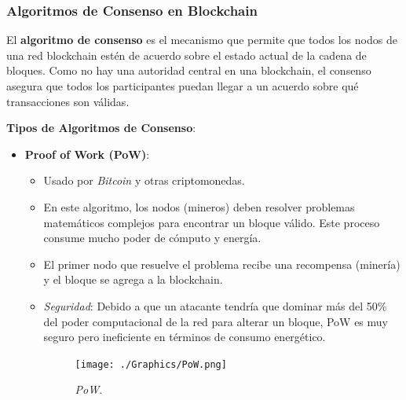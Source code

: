 \subsubsection{Algoritmos de Consenso en Blockchain}

El \textbf{algoritmo de consenso} es el mecanismo que permite que todos los nodos de una red blockchain estén de acuerdo sobre el estado actual de la cadena de bloques. Como no hay una autoridad central en una blockchain, el consenso asegura que todos los participantes puedan llegar a un acuerdo sobre qué transacciones son válidas.

\textbf{Tipos de Algoritmos de Consenso}:
\begin{itemize}
    \item \textbf{Proof of Work (PoW)}:
    \begin{itemize}
        \item Usado por \textit{Bitcoin} y otras criptomonedas.
        \item En este algoritmo, los nodos (mineros) deben resolver problemas matemáticos complejos para encontrar un bloque válido. Este proceso consume mucho poder de cómputo y energía.
        \item El primer nodo que resuelve el problema recibe una recompensa (minería) y el bloque se agrega a la blockchain.
        \item \textit{Seguridad}: Debido a que un atacante tendría que dominar más del 50\% del poder computacional de la red para alterar un bloque, PoW es muy seguro pero ineficiente en términos de consumo energético.
        \begin{figure}[!htbp]
            \centering
            \texttt{[image: ./Graphics/PoW.png]}
            \caption{\textit{PoW}.}
            \label{fig:PoW}
        \end{figure}
    \end{itemize}
    
\

\


\end{itemize}
